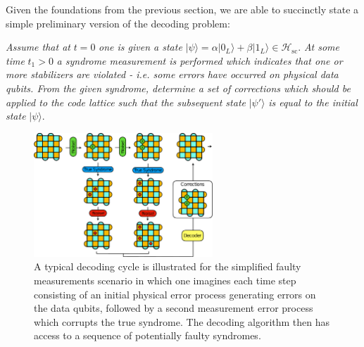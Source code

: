 \documentclass[twocolumn,preprintnumbers,amsmath,amssymb,notitlepage,nofootinbib,longbibliography,superscriptaddress,aps,pra,10pt]{revtex4-1}
\begin{document}
    Given the foundations from the previous section, we are able to succinctly state a simple preliminary version of the decoding problem:\newline

    \noindent\textit{Assume that at} $t=0$  \textit{one is given a state} $|\psi\rangle = \alpha |0_L\rangle + \beta |1_L\rangle \in \mathcal{H}_{\mathrm{sc}}.$ \textit{At some time }$t_1>0$ \textit{a syndrome measurement is performed which indicates that one or more stabilizers are violated - i.e. some errors have occurred on physical data qubits. From the given syndrome, determine a set of corrections which should be applied to the code lattice such that the subsequent state} $|\psi'\rangle$ \textit{is equal to the initial state} $|\psi\rangle.$ \newline

    \begin{figure}
      \centering
      \includegraphics[width=0.6\textwidth]{figures/decoding_problem.pdf}
      \caption{A typical decoding cycle is illustrated for the simplified faulty measurements scenario in which one imagines each time step consisting of an initial physical error process generating errors on the data qubits, followed by a second measurement error process which corrupts the true syndrome. The decoding algorithm then has access to a sequence of potentially faulty syndromes.}\label{f:decoding_problem}
    \end{figure}
\end{document}
